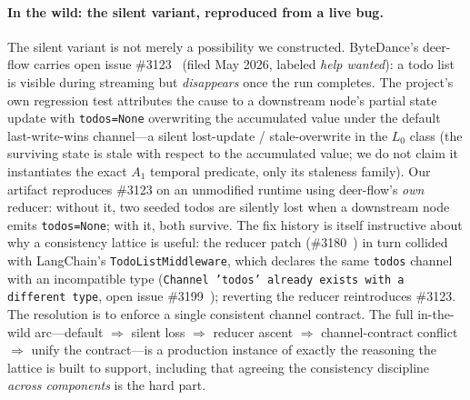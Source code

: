 \documentclass[journal,compsoc,10pt]{IEEEtran}
\providecommand{\citep}{\cite}
\theoremstyle{definition}
\theoremstyle{remark}
\begin{document}
\paragraph{In the wild: the silent variant, reproduced from a live bug.}
The silent variant is not merely a possibility we constructed. ByteDance's
deer-flow carries open issue \#3123~\citep{DeerFlowIssue3123} (filed May
2026, labeled \emph{help wanted}): a todo list is visible during
streaming but \emph{disappears} once the run completes. The project's own
regression test attributes the cause to a downstream node's partial state
update with \texttt{todos=None} overwriting the accumulated value under
the default last-write-wins channel---a silent lost-update / stale-overwrite
in the $L_0$ class (the surviving state is stale with respect to the
accumulated value; we do not claim it instantiates the exact $A_1$
temporal predicate, only its staleness family). Our artifact reproduces
\#3123 on an unmodified runtime using deer-flow's \emph{own} reducer:
without it, two seeded todos are silently lost when a downstream node
emits \texttt{todos=None}; with it, both survive. The fix history is
itself instructive about why a consistency lattice is useful: the reducer
patch (\#3180~\citep{DeerFlowPR3180}) in turn collided with LangChain's
\texttt{TodoListMiddleware}, which declares the same \texttt{todos}
channel with an incompatible type (\texttt{Channel 'todos' already exists
with a different type}, open issue \#3199~\citep{DeerFlowIssue3199});
reverting the reducer reintroduces \#3123. The resolution is to enforce a
single consistent channel contract. The full in-the-wild arc---default
$\Rightarrow$ silent loss $\Rightarrow$ reducer ascent $\Rightarrow$
channel-contract conflict $\Rightarrow$ unify the contract---is a
production instance of exactly the reasoning the lattice is built to
support, including that agreeing the consistency discipline \emph{across
components} is the hard part.
\end{document}
